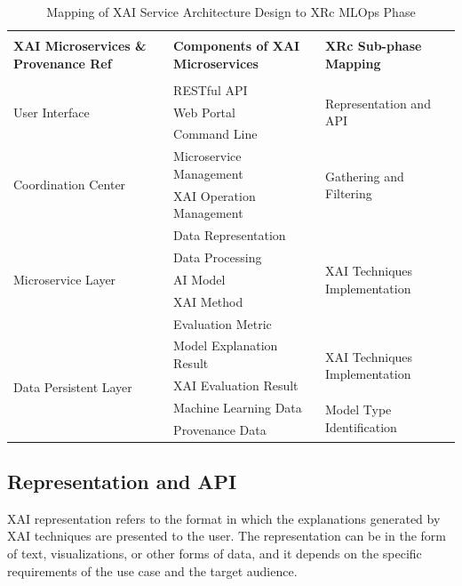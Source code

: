 \documentclass[conference]{IEEEtran}
\begin{document}
\begin{table}[htbp]
\caption{Mapping of XAI Service Architecture Design to XRc MLOps Phase}
\begin{center}
\label{Mapping}
\begin{tabular}{|l|l|l|}
\hline
 & & \\
\textbf{XAI Microservices \& Provenance Ref} & \textbf{Components of XAI Microservices}  & \textbf{XRc Sub-phase Mapping} \\
 & & \\ \hline
\multirow{3}{*}{User Interface} & RESTful API & \multirow{3}{*}{Representation and API} \\
 & Web Portal & \\
 & Command Line & \\ \hline 
\multirow{4}{*}{Coordination Center} & \multirow{2}{*}{Microservice Management} & \multirow{4}{*}{Gathering and Filtering} \\
 & & \\
 & \multirow{2}{*}{XAI Operation Management} & \\
 & & \\ \hline 
\multirow{5}{*}{Microservice Layer} & Data Representation & \multirow{5}{*}{XAI Techniques Implementation} \\
 & Data Processing & \\
 & AI Model & \\
 & XAI Method & \\
 & Evaluation Metric & \\ \hline
\multirow{4}{*}{Data Persistent Layer} & Model Explanation Result & \multirow{2}{*}{XAI Techniques Implementation} \\
 & XAI Evaluation Result & \\ \cline{2-3} 
 & Machine Learning Data & \multirow{2}{*}{Model Type Identification} \\
 & Provenance Data & \\ \hline
\end{tabular}
\end{center}
\end{table}
\subsection{Representation and API}
XAI representation refers to the format in which the explanations generated by XAI techniques are presented to the user. The representation can be in the form of text, visualizations, or other forms of data, and it depends on the specific requirements of the use case and the target audience.
\end{document}

